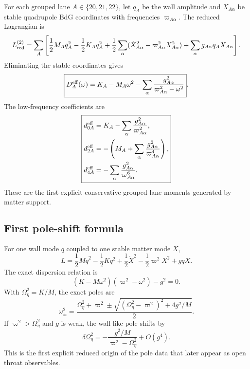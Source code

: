 For each grouped lane \(A\in\{20,21,22\}\), let \(q_A\) be the wall amplitude and \(X_{A\alpha}\) be stable quadrupole BdG coordinates with frequencies \(\varpi_{A\alpha}\).  The reduced Lagrangian is
\begin{equation}
L_{\rm red}^{(2)}
=
\sum_A\left[
\frac12M_A\dot q_A^2-\frac12K_Aq_A^2
+
\frac12\sum_\alpha(\dot X_{A\alpha}^2-\varpi_{A\alpha}^2X_{A\alpha}^2)
+
\sum_\alpha g_{A\alpha}q_AX_{A\alpha}
\right].
\end{equation}
Eliminating the stable coordinates gives
\begin{equation}
\label{eq:part01-DAeff-BdG}
\boxed{
D_A^{\rm eff}(\omega)
=
K_A-M_A\omega^2
-
\sum_\alpha\frac{g_{A\alpha}^2}{\varpi_{A\alpha}^2-\omega^2}}.
\end{equation}
The low-frequency coefficients are
\begin{equation}
\label{eq:part01-BdG-P2-coefficients}
\boxed{
\begin{aligned}
d_{0A}^{\rm eff}&=K_A-\sum_\alpha\frac{g_{A\alpha}^2}{\varpi_{A\alpha}^2},\\
d_{2A}^{\rm eff}&=-\left(M_A+\sum_\alpha\frac{g_{A\alpha}^2}{\varpi_{A\alpha}^4}\right),\\
d_{4A}^{\rm eff}&=-\sum_\alpha\frac{g_{A\alpha}^2}{\varpi_{A\alpha}^6}.
\end{aligned}
}
\end{equation}
These are the first explicit conservative grouped-lane moments generated by matter support.

\subsection{First pole-shift formula}
\label{subsec:part01-first-pole-shift}

For one wall mode \(q\) coupled to one stable matter mode \(X\),
\begin{equation}
L
=
\frac12M\dot q^2-\frac12Kq^2+\frac12\dot X^2-\frac12\varpi^2X^2+gqX.
\end{equation}
The exact dispersion relation is
\begin{equation}
\label{eq:part01-pole-dispersion}
(K-M\omega^2)(\varpi^2-\omega^2)-g^2=0.
\end{equation}
With \(\Omega_\eta^2=K/M\), the exact poles are
\begin{equation}
\label{eq:part01-pole-shifts-exact}
\boxed{
\omega_\pm^2
=
\frac{\Omega_\eta^2+\varpi^2
\pm\sqrt{(\Omega_\eta^2-\varpi^2)^2+4g^2/M}}{2}}.
\end{equation}
If \(\varpi^2>\Omega_\eta^2\) and \(g\) is weak, the wall-like pole shifts by
\begin{equation}
\label{eq:part01-wall-pole-shift}
\boxed{
\delta\Omega_\eta^2
=
-\frac{g^2/M}{\varpi^2-\Omega_\eta^2}+O(g^4)}.
\end{equation}
This is the first explicit reduced origin of the pole data that later appear as open throat observables.

